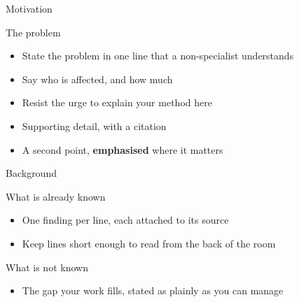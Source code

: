 
\begin{frame}{Motivation}

\begin{block}{The problem}
\begin{itemize}
    \item State the problem in one line that a non-specialist understands
    \item Say who is affected, and how much
    \item Resist the urge to explain your method here
\end{itemize}
\end{block}

\begin{block}{}
\begin{itemize}
    \item Supporting detail, with a citation~\cite{W3021074122}
    \item A second point, \textbf{emphasised} where it matters
\end{itemize}
\end{block}

\end{frame}


\begin{frame}[allowframebreaks]{Background}

\begin{block}{What is already known}
\begin{itemize}
    \item One finding per line, each attached to its source~\cite{W3135286407}
    \item Keep lines short enough to read from the back of the room
\end{itemize}
\end{block}

\begin{block}{What is not known}
\begin{itemize}
    \item The gap your work fills, stated as plainly as you can manage
\end{itemize}
\end{block}

\end{frame}
